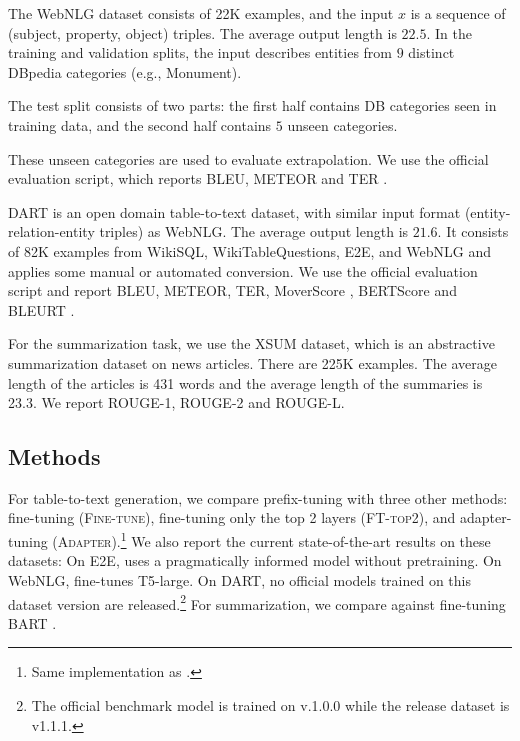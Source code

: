 The WebNLG \cite{webnlg-2017} dataset consists of 22K examples, and the input $x$ is a sequence of (subject, property, object) triples. The average output length is $22.5$. In the training and validation splits, the input describes entities from $9$ distinct DBpedia categories (e.g., Monument). 

The test split consists of two parts: the first half contains DB categories seen in training data, and the second half contains $5$ unseen categories.

These unseen categories are used to evaluate extrapolation. We use the official evaluation script, which reports BLEU, METEOR and TER \cite{ter}.  

DART \cite{radev2020dart} is an open domain table-to-text dataset, with similar input format (entity-relation-entity triples) as WebNLG. The average output length is $21.6$. It consists of 82K examples from WikiSQL, WikiTableQuestions, E2E, and WebNLG and applies some manual or automated conversion. We use the official evaluation script and report BLEU, METEOR, TER, MoverScore \cite{zhao-etal-2019-moverscore}, BERTScore \cite{bert-score} and BLEURT \cite{sellam-etal-2020-bleurt}. 

For the summarization task, we use the XSUM \cite{xsum-emnlp} dataset, which is an abstractive summarization dataset on news articles. There are 225K examples. The average length of the articles is 431 words and the average length of the summaries is 23.3. We report ROUGE-1, ROUGE-2 and ROUGE-L. 

\subsection{Methods}

For table-to-text generation, we compare prefix-tuning with three other methods: fine-tuning (\textsc{Fine-tune}), fine-tuning only the top 2 layers (\textsc{FT-top2}), and adapter-tuning (\textsc{Adapter}).\footnote{Same implementation as \citet{lin-etal-2020-exploring}.} We also report the current state-of-the-art results on these datasets: On E2E, \citet{shen-etal-2019-pragmatically} uses a pragmatically informed model without pretraining. On WebNLG, \citet{kale2020texttotext} fine-tunes T5-large. On DART, no official models trained on this dataset version are released.\footnote{The official benchmark model is trained on v.1.0.0 while the release dataset is v1.1.1.} For summarization, we compare against fine-tuning BART \cite{lewis-etal-2020-bart}. 

